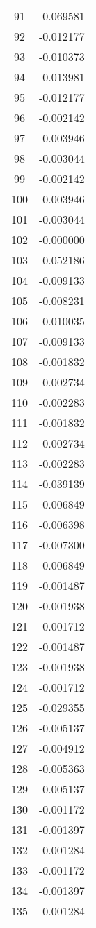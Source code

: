\documentclass[12pt]{article}
\begin{document}
\begin{longtable}{@{}cc@{}}
91 & -0.069581 \\
92 & -0.012177 \\
93 & -0.010373 \\
94 & -0.013981 \\
95 & -0.012177 \\
96 & -0.002142 \\
97 & -0.003946 \\
98 & -0.003044 \\
99 & -0.002142 \\
100 & -0.003946 \\
101 & -0.003044 \\
102 & -0.000000 \\
103 & -0.052186 \\
104 & -0.009133 \\
105 & -0.008231 \\
106 & -0.010035 \\
107 & -0.009133 \\
108 & -0.001832 \\
109 & -0.002734 \\
110 & -0.002283 \\
111 & -0.001832 \\
112 & -0.002734 \\
113 & -0.002283 \\
114 & -0.039139 \\
115 & -0.006849 \\
116 & -0.006398 \\
117 & -0.007300 \\
118 & -0.006849 \\
119 & -0.001487 \\
120 & -0.001938 \\
121 & -0.001712 \\
122 & -0.001487 \\
123 & -0.001938 \\
124 & -0.001712 \\
125 & -0.029355 \\
126 & -0.005137 \\
127 & -0.004912 \\
128 & -0.005363 \\
129 & -0.005137 \\
130 & -0.001172 \\
131 & -0.001397 \\
132 & -0.001284 \\
133 & -0.001172 \\
134 & -0.001397 \\
135 & -0.001284 \\

\end{longtable}
\end{document}

